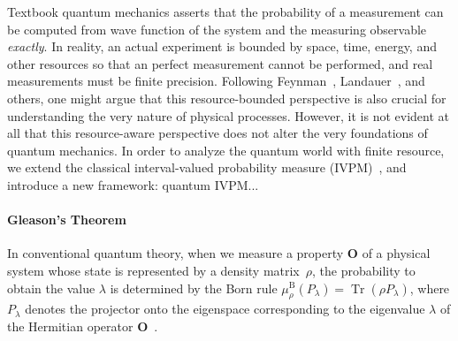 \documentclass[english,reprint, aps, prl,superscriptaddress, showpacs,
showkeys]{revtex4-1}
\theoremstyle{plain}
\theoremstyle{definition}
\newcommand{\Tr}{\mathop{\mathrm{Tr}}\nolimits}
\begin{document}

\maketitle

Textbook quantum mechanics asserts that the probability of a measurement
can be computed from wave function of the system and the measuring
observable \emph{exactly}. In reality, an actual experiment is bounded
by space, time, energy, and other resources so that an perfect measurement
cannot be performed, and real measurements must be finite precision.
Following Feynman~\cite{Feynman1982Simulating}, Landauer~\cite{Landauer1996188},
and others, one might argue that this resource-bounded perspective
is also crucial for understanding the very nature of physical processes.
However, it is not evident at all that this resource-aware perspective
does not alter the very foundations of quantum mechanics. In order
to analyze the quantum world with finite resource, we extend the classical
interval-valued probability measure (IVPM)~\cite{JamisonLodwick2004},
and introduce a new framework: quantum IVPM...\newpage{}

\paragraph{Gleason's Theorem}

In conventional quantum theory, when we measure a property $\mathbf{O}$
of a physical system whose state is represented by a density matrix~$\rho$,
the probability to obtain the value $\lambda$ is determined by the
Born rule $\mu_{\rho}^{\mathrm{\mathrm{B}}}\left(P_{\lambda}\right)=\Tr\left(\rho P_{\lambda}\right)$,
where $P_{\lambda}$ denotes the projector onto the eigenspace corresponding
to the eigenvalue $\lambda$ of the Hermitian operator $\mathbf{O}$~\citep{Born1983,peres1995quantum,544199,Jaeger2007}.
\end{document}
